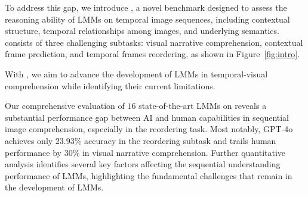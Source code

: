 To address this gap, we introduce \dataset, a novel benchmark designed to assess the reasoning ability of LMMs on temporal image sequences, including contextual structure, temporal relationships among images, and underlying semantics. \dataset consists of three challenging subtasks: visual narrative comprehension, contextual frame prediction, and temporal frames reordering, as shown in Figure~\ref{fig:intro}. 

With \dataset, we aim to advance the development of LMMs in temporal-visual comprehension while identifying their current limitations.

Our comprehensive evaluation of $16$ state-of-the-art LMMs on \dataset reveals a substantial performance gap between AI and human capabilities in sequential image comprehension, especially in the reordering task. Most notably, GPT-4o achieves only $23.93\%$ accuracy in the reordering subtask and trails human performance by $30\%$ in visual narrative comprehension. Further quantitative analysis identifies several key factors affecting the sequential understanding performance of LMMs, highlighting the fundamental challenges that remain in the development of LMMs.

